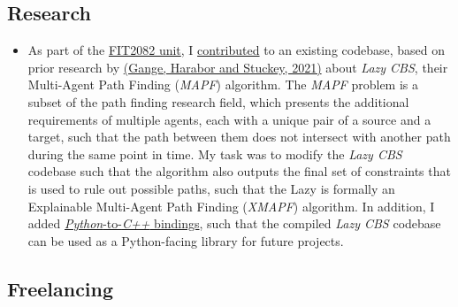 \documentclass[a4paper, 10pt]{article}
\begin{document}
	\subsection{Research}
	\begin{itemize}
		\item As part of the \href{https://handbook.monash.edu/2021/units/FIT2082}{FIT2082 unit}, I \href{https://github.com/AppleGamer22/FIT2082}{contributed} to an existing codebase, based on prior research by \href{https://ojs.aaai.org/index.php/ICAPS/article/view/3471}{(Gange, Harabor and Stuckey, 2021)} about \textsl{Lazy CBS}, their Multi-Agent Path Finding (\textsl{MAPF}) algorithm. The \textsl{MAPF} problem is a subset of the path finding research field, which presents the additional requirements of multiple agents, each with a unique pair of a source and a target, such that the path between them does not intersect with another path during the same point in time. My task was to modify the \textsl{Lazy CBS} codebase such that the algorithm also outputs the final set of constraints that is used to rule out possible paths, such that the Lazy is formally an Explainable Multi-Agent Path Finding (\textsl{XMAPF}) algorithm. In addition, I added \href{https://pybind11.readthedocs.io/en/stable/}{\textsl{Python}-to-\textsl{C++} bindings}, such that the compiled \textsl{Lazy CBS} codebase can be used as a Python-facing library for future projects.
	\end{itemize}

	\subsection{Freelancing}
\end{document}
